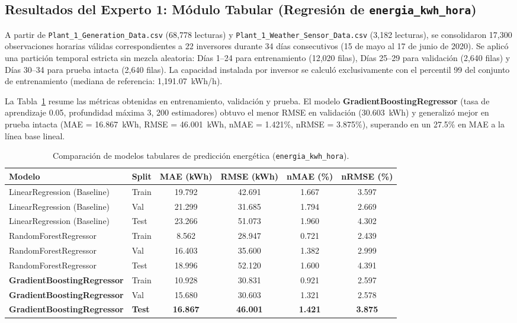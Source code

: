 \documentclass[12pt,a4paper]{article}
\begin{document}
\subsection{Resultados del Experto 1: Módulo Tabular (Regresión de \texttt{energia\_kwh\_hora})}
\label{sec:res_tabular}
A partir de \texttt{Plant\_1\_Generation\_Data.csv} (68,778 lecturas) y \texttt{Plant\_1\_Weather\_Sensor\_Data.csv} (3,182 lecturas), se consolidaron 17,300 observaciones horarias válidas correspondientes a 22 inversores durante 34 días consecutivos (15 de mayo al 17 de junio de 2020). Se aplicó una partición temporal estricta sin mezcla aleatoria: Días 1--24 para entrenamiento (12,020 filas), Días 25--29 para validación (2,640 filas) y Días 30--34 para prueba intacta (2,640 filas). La capacidad instalada por inversor se calculó exclusivamente con el percentil 99 del conjunto de entrenamiento (mediana de referencia: 1,191.07~kWh/h).

La Tabla~\ref{tab:res_tabular} resume las métricas obtenidas en entrenamiento, validación y prueba. El modelo \textbf{GradientBoostingRegressor} (tasa de aprendizaje 0.05, profundidad máxima 3, 200 estimadores) obtuvo el menor RMSE en validación (30.603~kWh) y generalizó mejor en prueba intacta (MAE = 16.867~kWh, RMSE = 46.001~kWh, nMAE = 1.421\%, nRMSE = 3.875\%), superando en un 27.5\% en MAE a la línea base lineal.

\begin{table}[H]
\centering
\caption{Comparación de modelos tabulares de predicción energética (\texttt{energia\_kwh\_hora}).}
\label{tab:res_tabular}
\small
\begin{tabular}{llcccc}
\toprule
\textbf{Modelo} & \textbf{Split} & \textbf{MAE (kWh)} & \textbf{RMSE (kWh)} & \textbf{nMAE (\%)} & \textbf{nRMSE (\%)} \\
\midrule
LinearRegression (Baseline) & Train & 19.792 & 42.691 & 1.667 & 3.597 \\
LinearRegression (Baseline) & Val   & 21.299 & 31.685 & 1.794 & 2.669 \\
LinearRegression (Baseline) & Test  & 23.266 & 51.073 & 1.960 & 4.302 \\
\midrule
RandomForestRegressor       & Train &  8.562 & 28.947 & 0.721 & 2.439 \\
RandomForestRegressor       & Val   & 16.403 & 35.600 & 1.382 & 2.999 \\
RandomForestRegressor       & Test  & 18.996 & 52.120 & 1.600 & 4.391 \\
\midrule
\textbf{GradientBoostingRegressor} & Train & 10.928 & 30.831 & 0.921 & 2.597 \\
\textbf{GradientBoostingRegressor} & Val   & 15.680 & 30.603 & 1.321 & 2.578 \\
\textbf{GradientBoostingRegressor} & \textbf{Test} & \textbf{16.867} & \textbf{46.001} & \textbf{1.421} & \textbf{3.875} \\
\bottomrule
\end{tabular}
\end{table}
\end{document}
